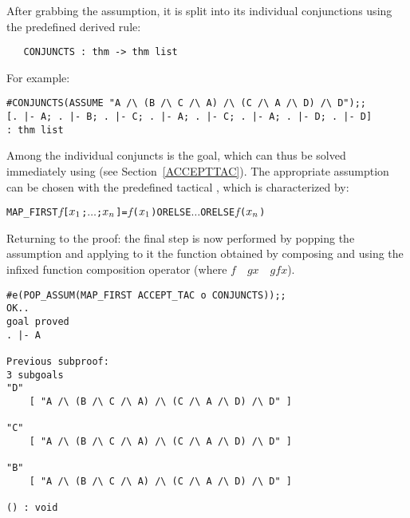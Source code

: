 After grabbing the assumption, it is split into its individual conjunctions
using the predefined derived rule:

\begin{hol}\begin{verbatim}
   CONJUNCTS : thm -> thm list
\end{verbatim}\end{hol}

\noindent For example:


\begin{session}\begin{verbatim}
#CONJUNCTS(ASSUME "A /\ (B /\ C /\ A) /\ (C /\ A /\ D) /\ D");;
[. |- A; . |- B; . |- C; . |- A; . |- C; . |- A; . |- D; . |- D]
: thm list
\end{verbatim}\end{session}

\noindent Among the individual conjuncts is the goal, which can thus be
solved immediately using  (see Section~\ref{ACCEPTTAC}).
The appropriate assumption can be chosen with the predefined tactical
, which
is characterized by:

\begin{hol}\begin{alltt}
   MAP_FIRST \(f\) [\(x\sb{1}\); \(\ldots\) ;\(x\sb{n}\)]  =  \(f\)(\(x\sb{1}\)) ORELSE \(\ldots\) ORELSE \(f\)(\(x\sb{n}\))
\end{alltt}\end{hol}

\noindent Returning to the proof: the final step is now performed by
popping the assumption and applying to it the function obtained by
composing  and  using the \ML{} infixed
function composition operator 
(where \ml{(}$f$~~$g$\ml{)}$x$~\ml{=}~$g$\ml{(}$f$\ml{(}$x$\ml{))}).

\begin{session}\begin{verbatim}
#e(POP_ASSUM(MAP_FIRST ACCEPT_TAC o CONJUNCTS));;
OK..
goal proved
. |- A

Previous subproof:
3 subgoals
"D"
    [ "A /\ (B /\ C /\ A) /\ (C /\ A /\ D) /\ D" ]

"C"
    [ "A /\ (B /\ C /\ A) /\ (C /\ A /\ D) /\ D" ]

"B"
    [ "A /\ (B /\ C /\ A) /\ (C /\ A /\ D) /\ D" ]

() : void
\end{verbatim}\end{session}


